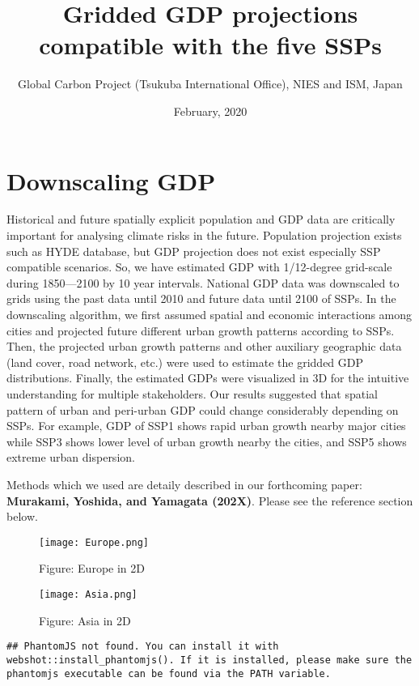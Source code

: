 \documentclass[]{book}
\title{Gridded GDP projections compatible with the five SSPs}
\author{Global Carbon Project (Tsukuba International Office), NIES and ISM, Japan}
\date{February, 2020}
\begin{document}
\maketitle

{
\setcounter{tocdepth}{1}
\tableofcontents
}
\hypertarget{downscaling-gdp}{%
\chapter*{Downscaling GDP}\label{downscaling-gdp}}

Historical and future spatially explicit population and GDP data are critically important for analysing climate risks in the future. Population projection exists such as HYDE database, but GDP projection does not exist especially SSP compatible scenarios. So, we have estimated GDP with 1/12-degree grid-scale during 1850---2100 by 10 year intervals. National GDP data was downscaled to grids using the past data until 2010 and future data until 2100 of SSPs. In the downscaling algorithm, we first assumed spatial and economic interactions among cities and projected future different urban growth patterns according to SSPs. Then, the projected urban growth patterns and other auxiliary geographic data (land cover, road network, etc.) were used to estimate the gridded GDP distributions. Finally, the estimated GDPs were visualized in 3D for the intuitive understanding for multiple stakeholders. Our results suggested that spatial pattern of urban and peri-urban GDP could change considerably depending on SSPs. For example, GDP of SSP1 shows rapid urban growth nearby major cities while SSP3 shows lower level of urban growth nearby the cities, and SSP5 shows extreme urban dispersion.

Methods which we used are detaily described in our forthcoming paper:
\textbf{Murakami, Yoshida, and Yamagata (202X)}. Please see the reference section below.

\begin{figure}
\centering
\texttt{[image: Europe.png]}
\caption{Figure: Europe in 2D}
\end{figure}

\begin{figure}
\centering
\texttt{[image: Asia.png]}
\caption{Figure: Asia in 2D}
\end{figure}

\begin{verbatim}
## PhantomJS not found. You can install it with webshot::install_phantomjs(). If it is installed, please make sure the phantomjs executable can be found via the PATH variable.
\end{verbatim}
\end{document}
